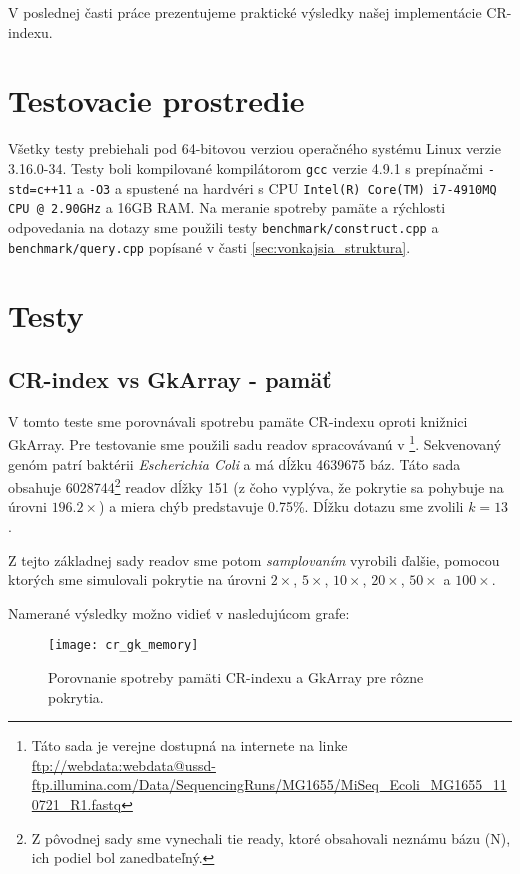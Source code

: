 V poslednej časti práce prezentujeme praktické výsledky našej implementácie CR-indexu.

\section{Testovacie prostredie}
Všetky testy prebiehali pod 64-bitovou verziou operačného systému Linux verzie 3.16.0-34. Testy boli kompilované kompilátorom \texttt{gcc} verzie 4.9.1 s prepínačmi \texttt{-std=c++11} a \texttt{-O3} a spustené na hardvéri s CPU \texttt{Intel(R) Core(TM) i7-4910MQ CPU @ 2.90GHz} a 16GB RAM. Na meranie spotreby pamäte a rýchlosti odpovedania na dotazy sme použili testy \texttt{benchmark/construct.cpp} a \texttt{benchmark/query.cpp} popísané v časti \ref{sec:vonkajsia_struktura}.

\section{Testy}

\subsection{CR-index vs GkArray - pamäť}
V tomto teste sme porovnávali spotrebu pamäte CR-indexu oproti knižnici GkArray. Pre testovanie sme použili sadu readov spracovávanú v \cite{DFPB13}\footnote{Táto sada je verejne dostupná na internete na linke \url{ftp://webdata:webdata@ussd-ftp.illumina.com/Data/SequencingRuns/MG1655/MiSeq_Ecoli_MG1655_110721_R1.fastq}}. Sekvenovaný genóm patrí baktérii \emph{Escherichia Coli} a má dĺžku 4639675 báz. Táto sada obsahuje 6028744\footnote{Z pôvodnej sady sme vynechali tie ready, ktoré obsahovali neznámu bázu (N), ich podiel bol zanedbateľný.} readov dĺžky 151 (z čoho vyplýva, že pokrytie sa pohybuje na úrovni $196.2\times$) a miera chýb predstavuje 0.75\%. Dĺžku dotazu sme zvolili $k=13$.

Z tejto základnej sady readov sme potom \emph{samplovaním} vyrobili ďalšie, pomocou ktorých sme simulovali pokrytie na úrovni $2\times$, $5\times$, $10\times$, $20\times$, $50\times$ a $100\times$.

Namerané výsledky možno vidieť v nasledujúcom grafe:

\begin{figure}[h]
    \centering
    \texttt{[image: cr\_gk\_memory]}
    \caption{Porovnanie spotreby pamäti CR-indexu a GkArray pre rôzne pokrytia.}
    \label{fig:graf_cr_gk_memory}
\end{figure}


